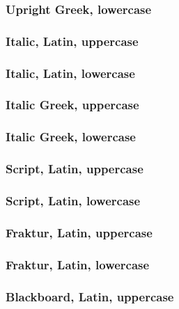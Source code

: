 \documentclass[final]{article}
\newcounter{#1}
\begin{document}
\subsubsection{Upright Greek, lowercase}

\subsubsection{Italic, Latin, uppercase}

\subsubsection{Italic, Latin, lowercase}

\subsubsection{Italic Greek, uppercase}

\subsubsection{Italic Greek, lowercase}

\subsubsection{Script, Latin, uppercase}

\subsubsection{Script, Latin, lowercase}

\subsubsection{Fraktur, Latin, uppercase}

\subsubsection{Fraktur, Latin, lowercase}

\subsubsection{Blackboard, Latin, uppercase}
\end{document}
